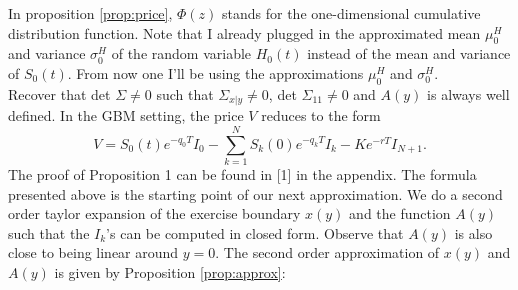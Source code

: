 \documentclass[a4paper]{article}
\begin{document}
In proposition \ref{prop:price}, $\Phi(z)$ stands for the one-dimensional cumulative distribution function. Note that I already plugged in the approximated mean $\mu_0^H$ and variance $\sigma_0^H$ of the random variable $H_0(t)$ instead of the mean and variance of $S_0(t)$. From now one I'll be using the approximations $\mu_0^H$ and $\sigma_0^H$.\\
Recover that det $\Sigma \neq 0$ such that $\Sigma_{x|y} \neq 0$, det $\Sigma_{11} \neq 0$ and $A(y)$ is always well defined. In the GBM setting, the price $V$ reduces to the form
\begin{equation}
\label{eq:cf}
V = S_0(t)e^{-q_0T}I_0-\sum_{k=1}^NS_k(0)e^{-q_kT}I_k-Ke^{-rT}I_{N+1}.
\end{equation}
The proof of Proposition 1 can be found in [1] in the appendix. 
The formula presented above is the starting point of our next approximation. We do a second order taylor expansion of the exercise boundary $x(y)$ and the function $A(y)$ such that the $I_k$'s can be computed in closed form. Observe that $A(y)$ is also close to being linear around $y=0$. The second order approximation of $x(y)$ and $A(y)$ is given by Proposition \ref{prop:approx}:
\end{document}
